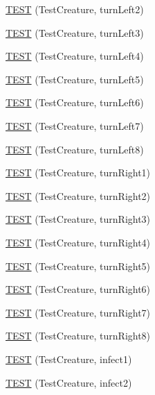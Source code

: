 \begin{DoxyCompactItemize}
\item 
\hyperlink{TestDarwin_8c_09_09_a55a080969231d28c3b6b0f6bf59853c9}{T\-E\-S\-T} (Test\-Creature, turn\-Left2)
\item 
\hyperlink{TestDarwin_8c_09_09_a4440151425250840bd625e8ebc39d29d}{T\-E\-S\-T} (Test\-Creature, turn\-Left3)
\item 
\hyperlink{TestDarwin_8c_09_09_a9c870f7b53bb2f143bbf0511d9e8b2ab}{T\-E\-S\-T} (Test\-Creature, turn\-Left4)
\item 
\hyperlink{TestDarwin_8c_09_09_a5cee6f702ee49f1e86cd8135c173e445}{T\-E\-S\-T} (Test\-Creature, turn\-Left5)
\item 
\hyperlink{TestDarwin_8c_09_09_aa13bb131a5410eb72306abb69be855d4}{T\-E\-S\-T} (Test\-Creature, turn\-Left6)
\item 
\hyperlink{TestDarwin_8c_09_09_a3493af453971ba0be38dab2f320f2021}{T\-E\-S\-T} (Test\-Creature, turn\-Left7)
\item 
\hyperlink{TestDarwin_8c_09_09_a8edced584de8bc992fa0eff916708ffd}{T\-E\-S\-T} (Test\-Creature, turn\-Left8)
\item 
\hyperlink{TestDarwin_8c_09_09_a9fffa612d7642be8ac9ab5624c43bb4e}{T\-E\-S\-T} (Test\-Creature, turn\-Right1)
\item 
\hyperlink{TestDarwin_8c_09_09_af1088f2a51dd60de0b1af93e1e6083bb}{T\-E\-S\-T} (Test\-Creature, turn\-Right2)
\item 
\hyperlink{TestDarwin_8c_09_09_a8f777849af0b80f2982d4e1d7863602b}{T\-E\-S\-T} (Test\-Creature, turn\-Right3)
\item 
\hyperlink{TestDarwin_8c_09_09_af21d11bee398582a51284357647f4376}{T\-E\-S\-T} (Test\-Creature, turn\-Right4)
\item 
\hyperlink{TestDarwin_8c_09_09_a62c6edbbbaa27acd13da5d2ee40651bf}{T\-E\-S\-T} (Test\-Creature, turn\-Right5)
\item 
\hyperlink{TestDarwin_8c_09_09_a1298fa206086546da548da71161c52f4}{T\-E\-S\-T} (Test\-Creature, turn\-Right6)
\item 
\hyperlink{TestDarwin_8c_09_09_a6b88536b33803f35cf2a5c984e80ac71}{T\-E\-S\-T} (Test\-Creature, turn\-Right7)
\item 
\hyperlink{TestDarwin_8c_09_09_a3d60d92a81922a3766dfafbffa4e063b}{T\-E\-S\-T} (Test\-Creature, turn\-Right8)
\item 
\hyperlink{TestDarwin_8c_09_09_a2865ceaab3aca8ba92ea3e2f3667f08f}{T\-E\-S\-T} (Test\-Creature, infect1)
\item 
\hyperlink{TestDarwin_8c_09_09_afb05e57c26e2a7dfd63c66eff1fc9d42}{T\-E\-S\-T} (Test\-Creature, infect2)

\end{DoxyCompactItemize}
